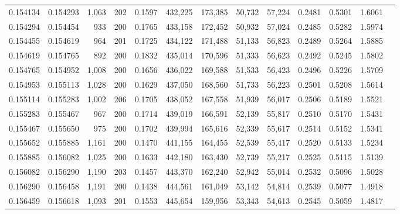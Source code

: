 \begin{tabular}{rrrrrrrrrrrrr}
0.154134 & 0.154293 & 1,063 & 202 &                                     0.1597 & 432,225 & 173,385 &  50,732 &  57,224 & 0.2481 & 0.5301 & 1.6061 \\
0.154294 & 0.154454 &   933 & 200 &                                     0.1765 & 433,158 & 172,452 &  50,932 &  57,024 & 0.2485 & 0.5282 & 1.5974 \\
0.154455 & 0.154619 &   964 & 201 &                                     0.1725 & 434,122 & 171,488 &  51,133 &  56,823 & 0.2489 & 0.5264 & 1.5885 \\
0.154619 & 0.154765 &   892 & 200 &                                     0.1832 & 435,014 & 170,596 &  51,333 &  56,623 & 0.2492 & 0.5245 & 1.5802 \\
0.154765 & 0.154952 & 1,008 & 200 &                                     0.1656 & 436,022 & 169,588 &  51,533 &  56,423 & 0.2496 & 0.5226 & 1.5709 \\
0.154953 & 0.155113 & 1,028 & 200 &                                     0.1629 & 437,050 & 168,560 &  51,733 &  56,223 & 0.2501 & 0.5208 & 1.5614 \\
0.155114 & 0.155283 & 1,002 & 206 &                                     0.1705 & 438,052 & 167,558 &  51,939 &  56,017 & 0.2506 & 0.5189 & 1.5521 \\
0.155283 & 0.155467 &   967 & 200 &                                     0.1714 & 439,019 & 166,591 &  52,139 &  55,817 & 0.2510 & 0.5170 & 1.5431 \\
0.155467 & 0.155650 &   975 & 200 &                                     0.1702 & 439,994 & 165,616 &  52,339 &  55,617 & 0.2514 & 0.5152 & 1.5341 \\
0.155652 & 0.155885 & 1,161 & 200 &                                     0.1470 & 441,155 & 164,455 &  52,539 &  55,417 & 0.2520 & 0.5133 & 1.5234 \\
0.155885 & 0.156082 & 1,025 & 200 &                                     0.1633 & 442,180 & 163,430 &  52,739 &  55,217 & 0.2525 & 0.5115 & 1.5139 \\
0.156082 & 0.156290 & 1,190 & 203 &                                     0.1457 & 443,370 & 162,240 &  52,942 &  55,014 & 0.2532 & 0.5096 & 1.5028 \\
0.156290 & 0.156458 & 1,191 & 200 &                                     0.1438 & 444,561 & 161,049 &  53,142 &  54,814 & 0.2539 & 0.5077 & 1.4918 \\
0.156459 & 0.156618 & 1,093 & 201 &                                     0.1553 & 445,654 & 159,956 &  53,343 &  54,613 & 0.2545 & 0.5059 & 1.4817 \\

\end{tabular}
